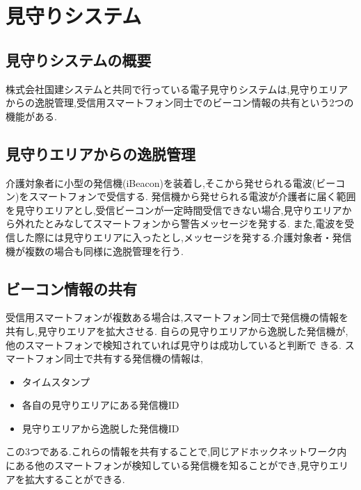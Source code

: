 \chapter{見守りシステム}
\label{chap:poordirection}


\section{見守りシステムの概要}
株式会社国建システムと共同で行っている電子見守りシステムは,見守りエリアからの逸脱管理,受信用スマートフォン同士でのビーコン情報の共有という2つの機能がある.

\section{見守りエリアからの逸脱管理}
介護対象者に小型の発信機(iBeacon)を装着し,そこから発せられる電波(ビーコン)をスマートフォンで受信する.
発信機から発せられる電波が介護者に届く範囲を見守りエリアとし,受信ビーコンが一定時間受信できない場合,見守りエリアから外れたとみなしてスマートフォンから警告メッセージを発する.
また,電波を受信した際には見守りエリアに入ったとし,メッセージを発する.介護対象者・発信機が複数の場合も同様に逸脱管理を行う.

\section{ビーコン情報の共有}
受信用スマートフォンが複数ある場合は,スマートフォン同士で発信機の情報を共有し,見守りエリアを拡大させる.
自らの見守りエリアから逸脱した発信機が,他のスマートフォンで検知されていれば見守りは成功していると判断で
きる.
スマートフォン同士で共有する発信機の情報は,

\begin{itemize}
\item タイムスタンプ
\item 各自の見守りエリアにある発信機ID
\item 見守りエリアから逸脱した発信機ID
\end{itemize}

この3つである.これらの情報を共有することで,同じアドホックネットワーク内にある他のスマートフォンが検知している発信機を知ることができ,見守りエリアを拡大することができる.
